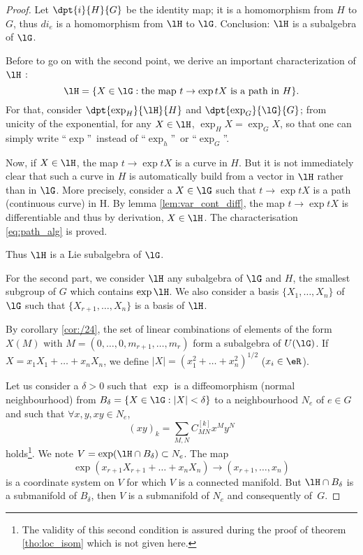 \begin{proof}

Let $\dpt{i}{H}{G}$ be the identity map; it is a homomorphism from $H$ to $G$, thus $di_e$ is a homomorphism from $\lH$ to $\lG$. Conclusion: $\lH$ is a subalgebra of $\lG$. 

Before to go on with the second point, we derive an important characterization of $\lH$ :
\begin{equation}\label{eq:path_alg}
\lH=\{X\in\lG:\text{the map } t\to\exp tX\text{ is a path in $H$}\}.
\end{equation}
For that, consider $\dpt{\exp_H}{\lH}{H}$ and $\dpt{\exp_G}{\lG}{G}$; from unicity of the exponential, for any $X\in\lH$, $\exp_HX=\exp_GX$, so that one can simply write ``$\exp$''\ instead of ``$\exp_h$''\ or ``$\exp_G$''.

Now, if $X\in\lH$, the map $t\to\exp tX$ is a curve in $H$. But it is not immediately clear that such a curve in $H$ is automatically build from a vector in $\lH$ rather than in $\lG$.  More precisely, consider a $X\in\lG$ such that $t\to\exp tX$ is a path (continuous curve) in H. By lemma \ref{lem:var_cont_diff}, the map $t\to\exp tX$ is differentiable and thus by derivation, $X\in\lH$.
The characterisation \eqref{eq:path_alg} is proved.

Thus $\lH$ is a Lie subalgebra of $\lG$.

For the second part, we consider $\lH$ any subalgebra of $\lG$ and $H$, the smallest subgroup of $G$ which contains $\exp\lH$. We also consider a basis $\{X_1,\ldots,X_n\}$ of $\lG$ such that $\{X_{r+1},\ldots,X_n\}$ is a basis of $\lH$.

By corollary \ref{cor:/24}, the set of linear combinations of elements of the form $X(M)$ with $M=(0,\ldots,0,m_{r+1},\ldots,m_r)$ form a subalgebra of $U(\lG)$. If $X=x_1X_1+\ldots+x_nX_n$, we define $|X|=(x_1^2+\ldots+x_n^2)^{1/2}$ ($x_i\in\eR$).

Let us consider a $\delta>0$ such that $\exp$ is a diffeomorphism (normal neighbourhood) from $B_{\delta}=\{X\in\lG:|X|<\delta\}$ to a neighbourhood $N_e$ of $e\in G$ and such that $\forall x,y,xy\in N_e$,
\begin{equation}\label{eq:coord_xy}
   (xy)_k=\sum_{M,N}C^{[k]}_{MN}x^My^N
\end{equation}
holds\footnote{The validity of this second condition is assured during the proof of theorem \ref{tho:loc_isom} which is not given here.}. We note $V=\exp(\lH\cap B_{\delta})\subset N_e$. The map
\[
   \exp(x_{r+1}X_{r+1}+\ldots+x_nX_n)\to(x_{r+1},\ldots,x_n)
\]
is a coordinate system on $V$ for which $V$ is a connected manifold. But $\lH\cap B_{\delta}$ is a submanifold of $B_{\delta}$, then $V$ is a submanifold of $N_e$ and consequently of~$G$.


\end{proof}
